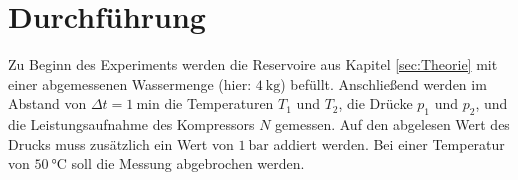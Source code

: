 \section{Durchführung} \label{sec:Durchführung}
    Zu Beginn des Experiments werden die Reservoire aus Kapitel \ref{sec:Theorie} mit einer abgemessenen Wassermenge (hier: $\SI{4}{\kilogram}$) befüllt.
    Anschließend werden im Abstand von $\Delta t = \SI{1}{\minute}$ die Temperaturen $T_1$ und $T_2$, die Drücke $p_1$ und $p_2$, und die Leistungsaufnahme des Kompressors $N$ gemessen.
    Auf den abgelesen Wert des Drucks muss zusätzlich ein Wert von $\SI{1}{\bar}$ addiert werden.
    Bei einer Temperatur von $\SI{50}{\celsius}$ soll die Messung abgebrochen werden.
